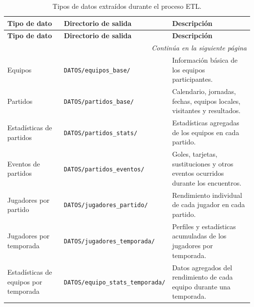 \renewcommand{\arraystretch}{1.2}

\begin{longtable}{|p{3.5cm}|p{4.9cm}|p{7cm}|}
\caption{Tipos de datos extraídos durante el proceso ETL.}
\label{tab:tipos_datos_etl} \\

\hline
\textbf{Tipo de dato} & \textbf{Directorio de salida} & \textbf{Descripción} \\ 
\hline
\endfirsthead

\hline
\textbf{Tipo de dato} & \textbf{Directorio de salida} & \textbf{Descripción} \\ 
\hline
\endhead

\hline
\multicolumn{3}{r}{\textit{Continúa en la siguiente página}} \\
\hline
\endfoot

\hline
\endlastfoot

Equipos &
\texttt{DATOS\slash equipos\_base\slash} &
Información básica de los equipos participantes. \\ \hline

Partidos &
\texttt{DATOS\slash partidos\_base\slash} &
Calendario, jornadas, fechas, equipos locales, visitantes y resultados. \\ \hline

Estadísticas de partidos &
\texttt{DATOS\slash partidos\_stats\slash} &
Estadísticas agregadas de los equipos en cada partido. \\ \hline

Eventos de partidos &
\texttt{DATOS\slash partidos\_eventos\slash} &
Goles, tarjetas, sustituciones y otros eventos ocurridos durante los encuentros. \\ \hline

Jugadores por partido &
\texttt{DATOS\slash jugadores\_partido\slash} &
Rendimiento individual de cada jugador en cada partido. \\ \hline

Jugadores por temporada &
\texttt{DATOS\slash jugadores\_temporada\slash} &
Perfiles y estadísticas acumuladas de los jugadores por temporada. \\ \hline

Estadísticas de equipos por temporada &
\texttt{DATOS\slash equipo\_stats\_temporada\slash} &
Datos agregados del rendimiento de cada equipo durante una temporada. \\ \hline

\end{longtable}

